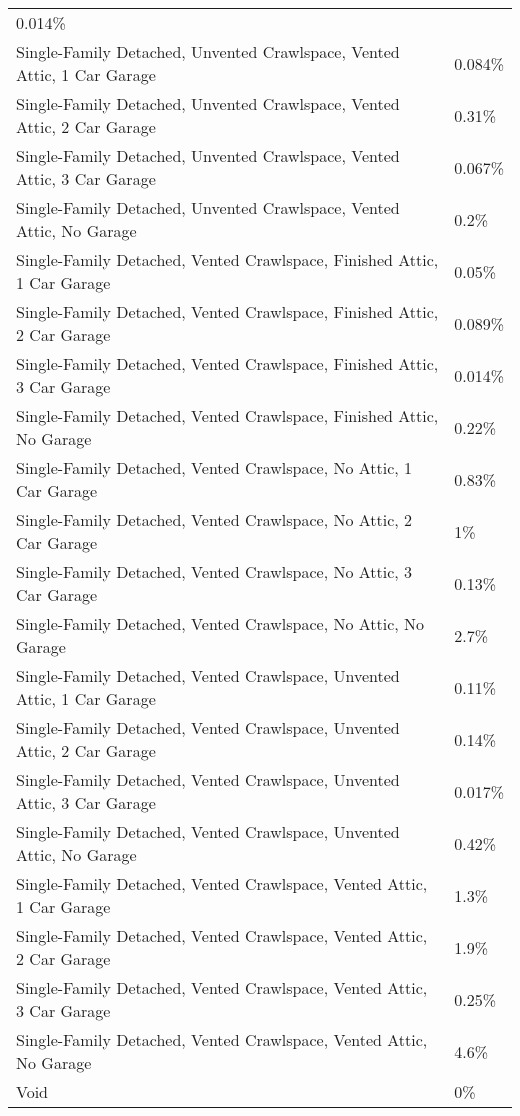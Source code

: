 \begin{longtable}[]{@{}ll@{}}
0.014\% \\
Single-Family Detached, Unvented Crawlspace, Vented Attic, 1 Car Garage
& 0.084\% \\
Single-Family Detached, Unvented Crawlspace, Vented Attic, 2 Car Garage
& 0.31\% \\
Single-Family Detached, Unvented Crawlspace, Vented Attic, 3 Car Garage
& 0.067\% \\
Single-Family Detached, Unvented Crawlspace, Vented Attic, No Garage &
0.2\% \\
Single-Family Detached, Vented Crawlspace, Finished Attic, 1 Car Garage
& 0.05\% \\
Single-Family Detached, Vented Crawlspace, Finished Attic, 2 Car Garage
& 0.089\% \\
Single-Family Detached, Vented Crawlspace, Finished Attic, 3 Car Garage
& 0.014\% \\
Single-Family Detached, Vented Crawlspace, Finished Attic, No Garage &
0.22\% \\
Single-Family Detached, Vented Crawlspace, No Attic, 1 Car Garage &
0.83\% \\
Single-Family Detached, Vented Crawlspace, No Attic, 2 Car Garage &
1\% \\
Single-Family Detached, Vented Crawlspace, No Attic, 3 Car Garage &
0.13\% \\
Single-Family Detached, Vented Crawlspace, No Attic, No Garage &
2.7\% \\
Single-Family Detached, Vented Crawlspace, Unvented Attic, 1 Car Garage
& 0.11\% \\
Single-Family Detached, Vented Crawlspace, Unvented Attic, 2 Car Garage
& 0.14\% \\
Single-Family Detached, Vented Crawlspace, Unvented Attic, 3 Car Garage
& 0.017\% \\
Single-Family Detached, Vented Crawlspace, Unvented Attic, No Garage &
0.42\% \\
Single-Family Detached, Vented Crawlspace, Vented Attic, 1 Car Garage &
1.3\% \\
Single-Family Detached, Vented Crawlspace, Vented Attic, 2 Car Garage &
1.9\% \\
Single-Family Detached, Vented Crawlspace, Vented Attic, 3 Car Garage &
0.25\% \\
Single-Family Detached, Vented Crawlspace, Vented Attic, No Garage &
4.6\% \\
Void & 0\% \\
\end{longtable}

